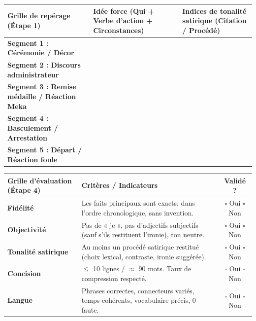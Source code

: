 \documentclass[11pt]{article}
\newcommand{\cle}[1]{{\popxbold\color{popdark}#1}}
\begin{document}
\begin{center}
\begin{tabularx}{\linewidth}{|>{\bfseries}l|X|X|}\hline
\textbf{Grille de repérage (Étape 1)} & \textbf{Idée force (Qui + Verbe d'action + Circonstances)} & \textbf{Indices de tonalité satirique (Citation / Procédé)} \\ \hline
Segment 1 : Cérémonie / Décor & & \\ \hline
Segment 2 : Discours administrateur & & \\ \hline
Segment 3 : Remise médaille / Réaction Meka & & \\ \hline
Segment 4 : Basculement / Arrestation & & \\ \hline
Segment 5 : Départ / Réaction foule & & \\ \hline
\end{tabularx}
\end{center}

\begin{center}
\begin{tabularx}{\linewidth}{|>{\bfseries}l|X|c|}\hline
\textbf{Grille d'évaluation (Étape 4)} & \textbf{Critères / Indicateurs} & \textbf{Validé ?} \\ \hline
\cle{Fidélité} & Les faits principaux sont exacts, dans l'ordre chronologique, sans invention. & $\square$ Oui $\square$ Non \\ \hline
\cle{Objectivité} & Pas de « je », pas d'adjectifs subjectifs (sauf s'ils restituent l'ironie), ton neutre. & $\square$ Oui $\square$ Non \\ \hline
\cle{Tonalité satirique} & Au moins un procédé satirique restitué (choix lexical, contraste, ironie suggérée). & $\square$ Oui $\square$ Non \\ \hline
\cle{Concision} & $\le$ 10 lignes / $\approx$ 90 mots. Taux de compression respecté. & $\square$ Oui $\square$ Non \\ \hline
\cle{Langue} & Phrases correctes, connecteurs variés, temps cohérents, vocabulaire précis, 0 faute. & $\square$ Oui $\square$ Non \\ \hline
\end{tabularx}
\end{center}
\end{document}
